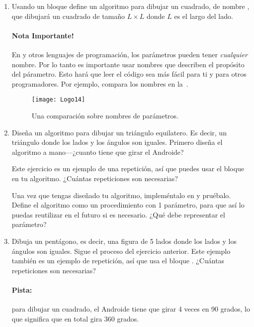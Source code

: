 \begin{enumerate}

\item Usando un bloque  define un algoritmo para
  dibujar un cuadrado, de nombre , que
  dibujará un cuadrado de tamaño $L \times L$ donde $L$ es el largo
  del lado.

\paragraph{Nota Importante!} En \AppInventor y otros lenguajes de
programación, los parámetros pueden tener \emph{cualquier} nombre. Por
lo tanto es importante usar nombres que describen el propósito del
párametro. Esto hará que leer el código sea más fácil para ti y para
otros programadores. Por ejemplo, compara los nombres en
la~.

\begin{figure}[H]
  \centering
  \texttt{[image: Logo14]}
  \caption{Una comparación sobre nombres de parámetros.}
  \label{fig:Logo14}
\end{figure}

\item Diseña un algoritmo para dibujar un triángulo equilatero. Es
  decir, un triángulo donde los lados y los ángulos son
  iguales. Primero diseña el algoritmo a mano---¿cuanto tiene que girar
  el Androide?

  Este ejercicio es un ejemplo de una repetición, así que puedes usar
  el bloque  en tu algoritmo. ¿Cuántas repeticiones
  son necesarias?

  Una vez que tengas diseñado tu algoritmo, impleméntalo en
  \AppInventor y pruébalo. Define el algoritmo como un procedimiento
  con 1 parámetro, para que así lo puedas reutilizar en el futuro si es
  necesario. ¿Qué debe representar el parámetro?

\item Dibuja un pentágono, es decir, una figura de 5 lados donde los
  lados y los ángulos son iguales. Sigue el proceso del ejercicio
  anterior. Este ejemplo también es un ejemplo de repetición, así que
  usa el bloque . ¿Cuántas repeticiones son
  necesarias?

\paragraph{Pista:} para dibujar un cuadrado, el Androide tiene que
girar 4 veces en 90 grados, lo que significa que en total gira 360
grados.


\end{enumerate}
